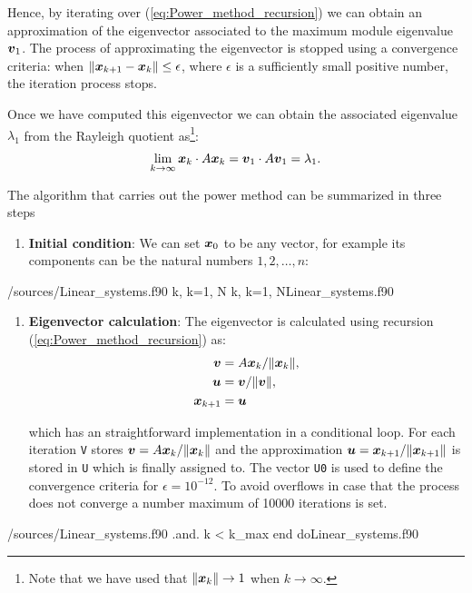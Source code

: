      Hence, by iterating over (\ref{eq:Power_method_recursion}) we can obtain an approximation of the eigenvector associated to the maximum module eigenvalue $\boldsymbol{v}_1$. The process of approximating the eigenvector is stopped using a convergence criteria: when $\norm{\boldsymbol{x}_{k+1} -\boldsymbol{x}_{k}}\leq \epsilon$, where $\epsilon$ is a sufficiently small positive number, the iteration process stops. 
     
     Once we have computed this eigenvector we can obtain the associated eigenvalue $\lambda_1$ from the Rayleigh quotient as\footnote{Note that we have used that $\norm{\boldsymbol{x}_{k}} \rightarrow 1$ when $k\rightarrow \infty$.}:
     \begin{align}
         \lim_{k\rightarrow\infty}
     	{\boldsymbol{x}_k\cdot A\boldsymbol{x}_k}
     	= 
     	{\boldsymbol{v}_1\cdot A\boldsymbol{v}_1} = \lambda_1.
     \end{align}
     
     
     The algorithm that carries out the power method can be summarized in three steps
     
     \begin{enumerate}
     	\item \textbf{Initial condition}: We can set $\boldsymbol{x}_0$ to be any vector, for example its components can be the natural numbers $1,2,\ldots,n$:
     \end{enumerate}
     \vspace{0.5cm} 
     \listings
     {\home/sources/Linear_systems.f90}
     {k, k=1, N}
     {k, k=1, N}{Linear_systems.f90}
 
     \begin{enumerate}[resume]
     	\item \textbf{Eigenvector calculation}: The eigenvector is calculated using recursion (\ref{eq:Power_method_recursion}) as:
     	\begin{align}
     		\boldsymbol{v} 
     		& 
     		= A \boldsymbol{x}_{k}/\norm{\boldsymbol{x}_{k}}, 
     		\\
     		\boldsymbol{u} 
     		& 
     		= \boldsymbol{v} /\norm{\boldsymbol{v}}, 
     		\\
     		\boldsymbol{x}_{k+1}
     		& 
     		= \boldsymbol{u} 
     	\end{align}
     	
     	which has an straightforward implementation in a conditional loop. For each iteration
     	\verb|V| stores $\boldsymbol{v} = A\boldsymbol{x}_{k}/\norm{ \boldsymbol{x}_{k}}$ and the approximation $\boldsymbol{u}=\boldsymbol{x}_{k+1}/\norm{ \boldsymbol{x}_{k+1}}$ is stored in \verb|U| which is finally assigned to. The vector \verb|U0| is used to define the convergence criteria for $\epsilon=10^{-12}$. To avoid overflows in case that the process does not converge a number maximum of 10000 iterations is set.
     	
     \end{enumerate}
     \vspace{0.5cm} 
     \listings
     {\home/sources/Linear_systems.f90}
     {.and. k < k_max}
     {end do}{Linear_systems.f90}
     
